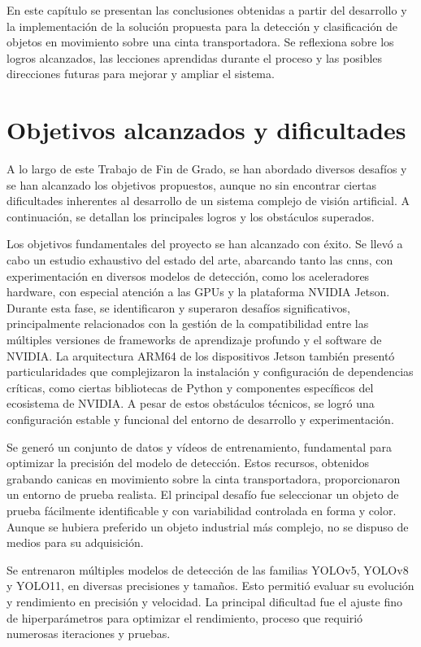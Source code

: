 \documentclass[11pt,spanish,listoffigures,listoftables]{tfgetsinf}
\begin{document}
En este capítulo se presentan las conclusiones obtenidas a partir del desarrollo y la implementación de la solución propuesta para la detección y clasificación de objetos en movimiento sobre una cinta transportadora. Se reflexiona sobre los logros alcanzados, las lecciones aprendidas durante el proceso y las posibles direcciones futuras para mejorar y ampliar el sistema.

\section{Objetivos alcanzados y dificultades}

A lo largo de este Trabajo de Fin de Grado, se han abordado diversos desafíos y se han alcanzado los objetivos propuestos, aunque no sin encontrar ciertas dificultades inherentes al desarrollo de un sistema complejo de visión artificial. A continuación, se detallan los principales logros y los obstáculos superados.

Los objetivos fundamentales del proyecto se han alcanzado con éxito. Se llevó a cabo un estudio exhaustivo del estado del arte, abarcando tanto las \glspl{cnn}, con experimentación en diversos modelos de detección, como los aceleradores hardware, con especial atención a las GPUs y la plataforma NVIDIA Jetson. Durante esta fase, se identificaron y superaron desafíos significativos, principalmente relacionados con la gestión de la compatibilidad entre las múltiples versiones de frameworks de aprendizaje profundo y el software de NVIDIA. La arquitectura ARM64 de los dispositivos Jetson también presentó particularidades que complejizaron la instalación y configuración de dependencias críticas, como ciertas bibliotecas de Python y componentes específicos del ecosistema de NVIDIA. A pesar de estos obstáculos técnicos, se logró una configuración estable y funcional del entorno de desarrollo y experimentación.

Se generó un conjunto de datos y vídeos de entrenamiento, fundamental para optimizar la precisión del modelo de detección. Estos recursos, obtenidos grabando canicas en movimiento sobre la cinta transportadora, proporcionaron un entorno de prueba realista. El principal desafío fue seleccionar un objeto de prueba fácilmente identificable y con variabilidad controlada en forma y color. Aunque se hubiera preferido un objeto industrial más complejo, no se dispuso de medios para su adquisición.

Se entrenaron múltiples modelos de detección de las familias YOLOv5, YOLOv8 y YOLO11, en diversas precisiones y tamaños. Esto permitió evaluar su evolución y rendimiento en precisión y velocidad. La principal dificultad fue el ajuste fino de hiperparámetros para optimizar el rendimiento, proceso que requirió numerosas iteraciones y pruebas.
\end{document}
